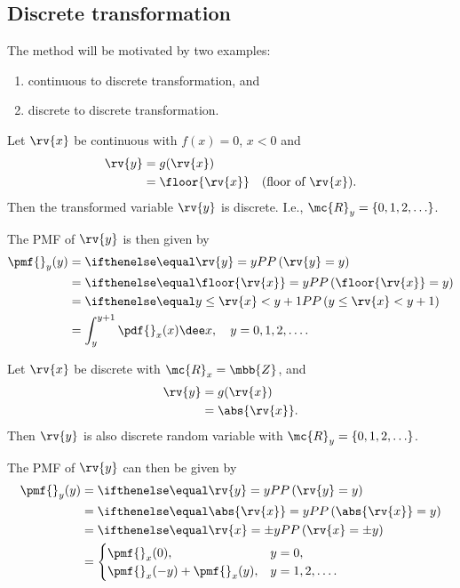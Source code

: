 \subsection{Discrete transformation}
The method will be motivated by two examples:
\begin{enumerate}
    \item continuous to discrete transformation, and
    \item discrete to discrete transformation.
\end{enumerate}
\begin{example}
    Let $\rv{x}$ be continuous with $f(x)=0$, $x<0$ and
    \begin{align}
        \rv{y} &= g(\rv{x})\\
        &= \floor{\rv{x}} \quad \text{(floor of $\rv{x}$)}.
    \end{align}
    Then the transformed variable $\rv{y}$ is discrete. I.e., $\mc{R}_{y}=\left\{ 0,1,2,\ldots\right\}$.
    
    The PMF of $\rv{y}$ is then given by 
    \begin{align}
        \pmf{}_{y}(y) 
        &= \prob{\rv{y}=y}\\
        &= \prob{\floor{\rv{x}}=y}\\
        &= \prob{y\leq \rv{x}<y+1}\\
        &= \int_{y}^{y+1}\pdf{}_{x}(x)\dee x, \quad y = 0,1,2,\ldots.
    \end{align}
    \triqed
\end{example}
\begin{example}
    Let $\rv{x}$ be discrete with $\mc{R}_{x}=\mbb{Z}$, and 
    \begin{align}
        \rv{y}
        &= g(\rv{x})\\
        &= \abs{\rv{x}}.
    \end{align}
    Then $\rv{y}$ is also discrete random variable with $\mc{R}_{y}=\left\{ 0,1,2,\ldots\right\}$.

    The PMF of $\rv{y}$ can then be given by
    \begin{align}
        \pmf{}_{y}(y) &= \prob{\rv{y}=y}\\
        &= \prob{\abs{\rv{x}}=y}\\
        &= \prob{\rv{x}=\pm y}\\
        &= 
        \begin{cases}
            \pmf{}_{x}(0), & y=0,\\
            \pmf{}_{x}(-y)+\pmf{}_{x}(y), & y=1,2,\ldots.
        \end{cases}
    \end{align}
    \triqed
\end{example}

